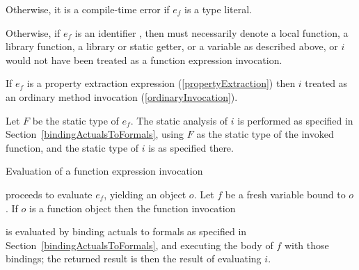 \documentclass[makeidx]{article}
\begin{document}
{\LMHash{}%
Otherwise, it is a compile-time error if $e_f$ is a type literal.


\LMHash{}%
Otherwise, if $e_f$ is an identifier \id, then \id{} must necessarily denote
a local function, a library function, a library or static getter,
or a variable as described above,
or $i$ would not have been treated as a function expression invocation.

\LMHash{}%
If $e_f$ is a property extraction expression
(\ref{propertyExtraction})
then $i$ treated as an ordinary method invocation
(\ref{ordinaryInvocation}).


\LMHash{}%
Let $F$ be the static type of $e_f$.
The static analysis of $i$ is performed as specified in Section~\ref{bindingActualsToFormals},
using $F$ as the static type of the invoked function,
and the static type of $i$ is as specified there.

\LMHash{}%
Evaluation of a function expression invocation

\noindent
{}

\noindent
proceeds to evaluate $e_f$, yielding an object $o$.
Let $f$ be a fresh variable bound to $o$.
If $o$ is a function object then the function invocation

\noindent
{}

\noindent
is evaluated by binding actuals to formals as specified in Section~\ref{bindingActualsToFormals},
and executing the body of $f$ with those bindings;
the returned result is then the result of evaluating $i$.

}
\end{document}
